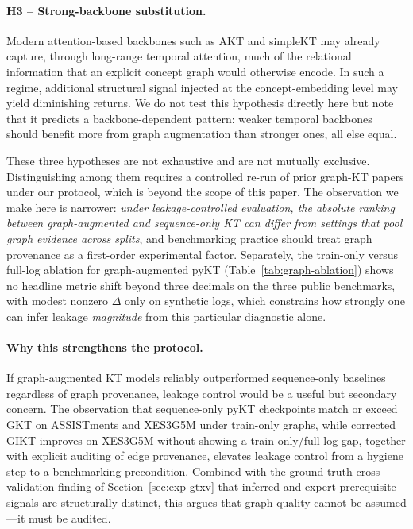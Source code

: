 \documentclass[runningheads]{llncs}
\begin{document}
\paragraph{H3 -- Strong-backbone substitution.}
Modern attention-based backbones such as AKT and simpleKT may already
capture, through long-range temporal attention, much of the relational
information that an explicit concept graph would otherwise encode. In
such a regime, additional structural signal injected at the
concept-embedding level may yield diminishing returns. We do not test
this hypothesis directly here but note that it predicts a
backbone-dependent pattern: weaker temporal backbones should benefit
more from graph augmentation than stronger ones, all else equal.

These three hypotheses are not exhaustive and are not mutually
exclusive. Distinguishing among them requires a controlled re-run of
prior graph-KT papers under our protocol, which is beyond the scope
of this paper. The observation we make here is narrower:
\emph{under leakage-controlled evaluation, the absolute ranking between
graph-augmented and sequence-only KT can differ from settings that pool graph
evidence across splits}, and benchmarking practice should treat graph provenance
as a first-order experimental factor.
Separately, the train-only versus full-log ablation for graph-augmented pyKT
(Table~\ref{tab:graph-ablation}) shows no headline metric shift beyond three decimals
on the three public benchmarks, with modest nonzero $\Delta$ only on synthetic logs,
which constrains how strongly one can infer leakage \emph{magnitude} from this
particular diagnostic alone.

\paragraph{Why this strengthens the protocol.}
If graph-augmented KT models reliably outperformed sequence-only
baselines regardless of graph provenance, leakage control would be a
useful but secondary concern.
The observation that sequence-only pyKT checkpoints match or exceed GKT on
ASSISTments and XES3G5M under train-only graphs, while corrected GIKT improves on
XES3G5M without showing a train-only/full-log gap, together with explicit auditing of edge
provenance, elevates leakage control from a hygiene step to a benchmarking
precondition.
Combined with the ground-truth cross-validation finding of Section~\ref{sec:exp-gtxv}
that inferred and expert prerequisite signals are structurally
distinct, this argues that graph quality cannot be assumed---it must
be audited.
\end{document}
